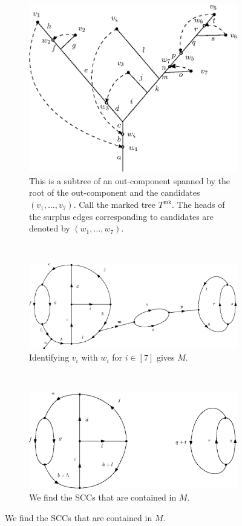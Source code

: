 \begin{figure}
\centering
\begin{subfigure}{.7\textwidth}
 \centering
    \includegraphics[width=0.8\linewidth]{Content/Pictures/out_componentswithmarks.eps}
    \caption{This is a subtree of an out-component spanned by the root of the out-component and the candidates $(v_1,\dots,v_7)$. Call the marked tree $T^{\mathrm{mk}}$. The heads of the surplus edges corresponding to candidates are denoted by $(w_1,\dots,w_7)$. }
\label{figure.extractSCCs1}
\end{subfigure}\\
\vspace{1.5em}
\begin{subfigure}{.8\textwidth}
  \centering
  \includegraphics[width=0.9\linewidth]{Content/Pictures/Fig8a.eps}
  \caption{Identifying $v_i$ with $w_i$ for $i\in [7]$ gives $M$.}
  \label{figure.extractSCCs2}
\end{subfigure}\\
\vspace{1.5em}
\begin{subfigure}{.8\textwidth}
  \centering
  \includegraphics[width=0.9\linewidth]{Content/Pictures/Fig8b.eps}
  \caption{We find the SCCs that are contained in $M$.}
  \label{figure.extractSCCs3}
\end{subfigure}


\end{figure}
